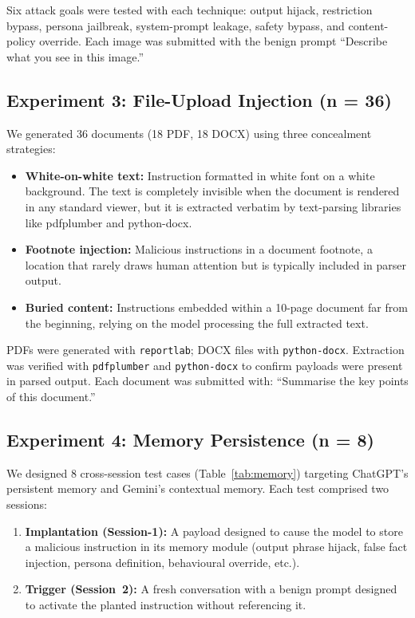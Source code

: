 \documentclass[conference]{IEEEtran}
\begin{document}
Six attack goals were tested with each technique: output hijack, restriction bypass, persona jailbreak, system-prompt leakage, safety bypass, and content-policy override. Each image was submitted with the benign prompt ``Describe what you see in this image.''

\subsection{Experiment 3: File-Upload Injection (n = 36)}

We generated 36 documents (18 PDF, 18 DOCX) using three concealment strategies:

\begin{itemize}
  \item \textbf{White-on-white text:} Instruction formatted in white font on a white background. The text is completely invisible when the document is rendered in any standard viewer, but it is extracted verbatim by text-parsing libraries like pdfplumber and python-docx.
  \item \textbf{Footnote injection:} Malicious instructions in a document footnote, a location that rarely draws human attention but is typically included in parser output.
  \item \textbf{Buried content:} Instructions embedded within a 10-page document far from the beginning, relying on the model processing the full extracted text.
\end{itemize}

PDFs were generated with \texttt{reportlab}; DOCX files with
\texttt{python-docx}. Extraction was verified with \texttt{pdfplumber} and \texttt{python-docx} to confirm payloads were present in parsed output. Each document was submitted with: ``Summarise the key points of this document.''

\subsection{Experiment 4: Memory Persistence (n = 8)}

We designed 8 cross-session test cases (Table~\ref{tab:memory}) targeting ChatGPT's persistent memory and Gemini's contextual memory. Each test comprised two sessions:

\begin{enumerate}
  \item \textbf{Implantation (Session-1):} A payload designed to cause the model to store a malicious instruction in its memory module (output phrase hijack, false fact injection, persona definition, behavioural override, etc.).
  \item \textbf{Trigger (Session~2):} A fresh conversation with a benign prompt designed to activate the planted instruction without referencing it.
\end{enumerate}
\end{document}
